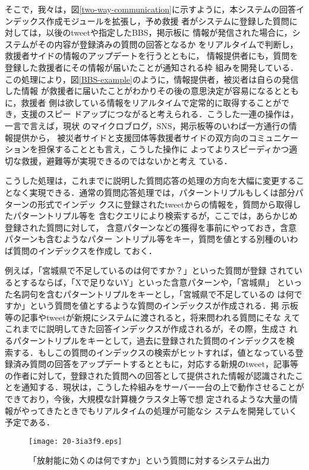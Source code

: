 \documentclass[japanese]{jnlp_1.4}
\begin{document}
そこで，我々は，図\ref{two-way-communication}に示すように，本システムの回答インデックス作成モジュールを拡張し，予め救援
者がシステムに登録した質問に対しては，以後のtweetや指定したBBS，掲示板に
情報が発信された場合に，システムがその内容が登録済みの質問の回答となるか
をリアルタイムで判断し，救援者サイドの情報のアップデートを行うとともに，
情報提供者にも，質問を登録した救援者にその情報が届いたことが通知される枠
組みを開発している．この処理により，図\ref{BBS-example}のように，情報提供者，被災者は自らの発信した情報
が救援者に届いたことがわかりその後の意思決定が容易になるとともに，救援者
側は欲している情報をリアルタイムで定常的に取得することができ，支援のスピー
ドアップにつながると考えられる．こうした一連の操作は，一言で言えば，現状
のマイクロブログ，SNS，掲示板等のいわば一方通行の情報提供から，
被災者サイドと支援団体等救援者サイドの双方向のコミュニケーションを担保することとも言え，こうした操作に
よってよりスピーディかつ適切な救援，避難等が実現できるのではないかと考え
ている．

こうした処理は，これまでに説明した質問応答の処理の方向を大幅に変更するこ
となく実現できる．通常の質問応答処理では，パターントリプルもしくは部分パ
ターンの形式でインデッ
クスに登録されたtweetからの情報を，質問から取得したパターントリプル等を
含むクエリにより検索するが，ここでは，あらかじめ登録された質問に対して，
含意パターンなどの獲得を事前にやっておき，含意パターンも含むようなパター
ントリプル等をキー，質問を値とする別種のいわば質問のインデックスを作成し
ておく．

例えば，「宮城県で不足しているのは何ですか？」といった質問が登録
されているとするならば，「Xで足りないY」といった含意パターンや，「宮城県」
といった名詞句を含むパターントリプルをキーとし，「宮城県で不足しているの
は何ですか」という質問を値とするような質問のインデックスが作成される．掲
示板等の記事やtweetが新規にシステムに渡されると，将来問われる質問にそな
えてこれまでに説明してきた回答インデックスが作成されるが，その際，生成さ
れるパターントリプルをキーとして，過去に登録された質問のインデックスを検
索する．もしこの質問のインデックスの検索がヒットすれば，値となっている登
録済み質問の回答をアップデートするとともに，対応する新規のtweet，記事等
の作者に対して，登録された質問への回答として提供された情報が認識されたこ
とを通知する．現状は，こうした枠組みをサーバー一台の上で動作させることが
できており，今後，大規模な計算機クラスタ上等で想
定されるような大量の情報がやってきたときでもリアルタイムの処理が可能なシ
ステムを開発していく予定である．

\begin{figure}[t]
\begin{center}
\texttt{[image: 20-3ia3f9.eps]}
\end{center}
\caption{「放射能に効くのは何ですか」という質問に対するシステム出力}
\label{radiation_example}
\end{figure}
\end{document}
